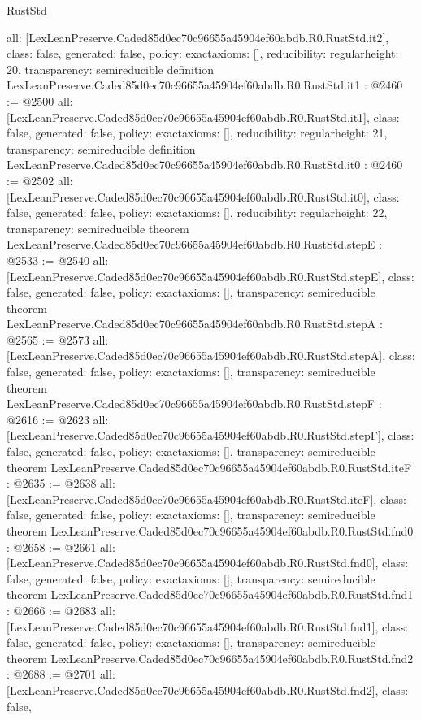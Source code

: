 \begin{lexlean}{RustStd}
\begin{coremodule}
{  all: [LexLeanPreserve.Caded85d0ec70c96655a45904ef60abdb.R0.RustStd.it2],
  class: false,
  generated: false,
  policy: exact{axioms: []},
  reducibility: regular{height: 20},
  transparency: semireducible
}
definition LexLeanPreserve.Caded85d0ec70c96655a45904ef60abdb.R0.RustStd.it1 : @2460 := @2500 {
  all: [LexLeanPreserve.Caded85d0ec70c96655a45904ef60abdb.R0.RustStd.it1],
  class: false,
  generated: false,
  policy: exact{axioms: []},
  reducibility: regular{height: 21},
  transparency: semireducible
}
definition LexLeanPreserve.Caded85d0ec70c96655a45904ef60abdb.R0.RustStd.it0 : @2460 := @2502 {
  all: [LexLeanPreserve.Caded85d0ec70c96655a45904ef60abdb.R0.RustStd.it0],
  class: false,
  generated: false,
  policy: exact{axioms: []},
  reducibility: regular{height: 22},
  transparency: semireducible
}
theorem LexLeanPreserve.Caded85d0ec70c96655a45904ef60abdb.R0.RustStd.stepE : @2533 := @2540 {
  all: [LexLeanPreserve.Caded85d0ec70c96655a45904ef60abdb.R0.RustStd.stepE],
  class: false,
  generated: false,
  policy: exact{axioms: []},
  transparency: semireducible
}
theorem LexLeanPreserve.Caded85d0ec70c96655a45904ef60abdb.R0.RustStd.stepA : @2565 := @2573 {
  all: [LexLeanPreserve.Caded85d0ec70c96655a45904ef60abdb.R0.RustStd.stepA],
  class: false,
  generated: false,
  policy: exact{axioms: []},
  transparency: semireducible
}
theorem LexLeanPreserve.Caded85d0ec70c96655a45904ef60abdb.R0.RustStd.stepF : @2616 := @2623 {
  all: [LexLeanPreserve.Caded85d0ec70c96655a45904ef60abdb.R0.RustStd.stepF],
  class: false,
  generated: false,
  policy: exact{axioms: []},
  transparency: semireducible
}
theorem LexLeanPreserve.Caded85d0ec70c96655a45904ef60abdb.R0.RustStd.iteF : @2635 := @2638 {
  all: [LexLeanPreserve.Caded85d0ec70c96655a45904ef60abdb.R0.RustStd.iteF],
  class: false,
  generated: false,
  policy: exact{axioms: []},
  transparency: semireducible
}
theorem LexLeanPreserve.Caded85d0ec70c96655a45904ef60abdb.R0.RustStd.fnd0 : @2658 := @2661 {
  all: [LexLeanPreserve.Caded85d0ec70c96655a45904ef60abdb.R0.RustStd.fnd0],
  class: false,
  generated: false,
  policy: exact{axioms: []},
  transparency: semireducible
}
theorem LexLeanPreserve.Caded85d0ec70c96655a45904ef60abdb.R0.RustStd.fnd1 : @2666 := @2683 {
  all: [LexLeanPreserve.Caded85d0ec70c96655a45904ef60abdb.R0.RustStd.fnd1],
  class: false,
  generated: false,
  policy: exact{axioms: []},
  transparency: semireducible
}
theorem LexLeanPreserve.Caded85d0ec70c96655a45904ef60abdb.R0.RustStd.fnd2 : @2688 := @2701 {
  all: [LexLeanPreserve.Caded85d0ec70c96655a45904ef60abdb.R0.RustStd.fnd2],
  class: false,
}
\end{coremodule}
\end{lexlean}
